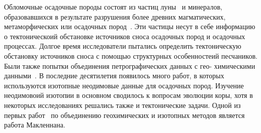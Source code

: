\documentclass[a4paper,12pt]{article}
\begin{document}
Обломочные осадочные породы состоят из частиц луны~\parencite{luna} и минералов, образовавшихся в результате разрушения более древних магматических, метаморфических или осадочных пород~\parencite{art}.
Эти частицы несут в себе информацию о тектоническоий обстановке источников сноса осадочных пород и осадочных процессах. Долгое время исследователи пытались определить тектоническую обстановку источников сноса с помощью структурных особенностеий песчаников. Были также попытки объединения петрографических данных с гео- химическими данными~\parencite{batlas}. 
В последние десятилетия появилось много работ, в которых используются изотопные неодимовые данные для осадочных пород. Изучение неодимовоий изотопии в основном сводилось к вопросам эволюции коры, хотя в некоторых исследованиях решались также и тектонические задачи. Одной из первых работ~\parencite{ivanov} по объединению геохимических и изотопных методов является работа Макленнана.

\printbibliography
\end{document}
